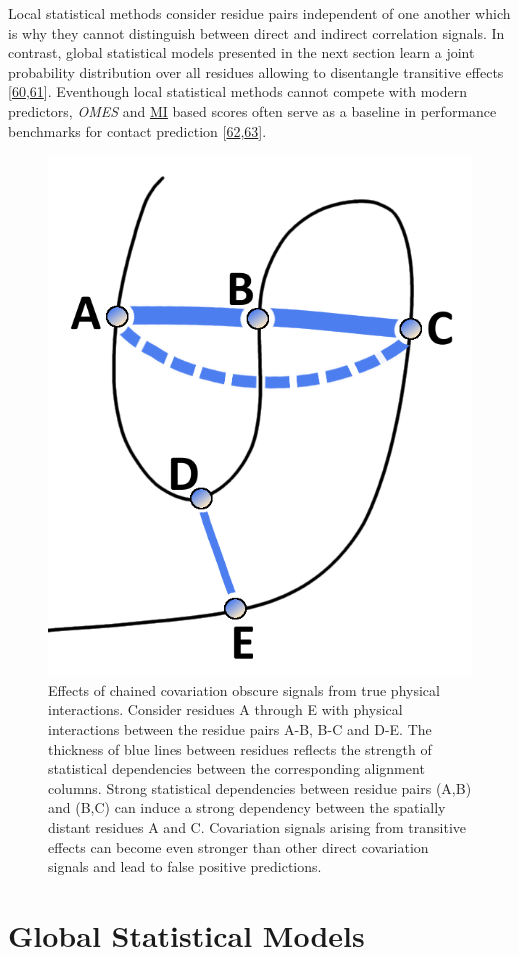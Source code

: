 \documentclass[11pt,a4paper,twoside]{book}
\theoremstyle{definition}
\theoremstyle{definition}
\theoremstyle{remark}
\begin{document}
Local statistical methods consider residue pairs independent of one
another which is why they cannot distinguish between direct and indirect
correlation signals. In contrast, global statistical models presented in
the next section learn a joint probability distribution over all
residues allowing to disentangle transitive effects
{[}\protect\hyperlink{ref-Burger2010}{60},\protect\hyperlink{ref-Weigt2009}{61}{]}.
Eventhough local statistical methods cannot compete with modern
predictors, \emph{OMES} and \protect\hyperlink{abbrev}{MI} based scores
often serve as a baseline in performance benchmarks for contact
prediction
{[}\protect\hyperlink{ref-DeJuan2013}{62},\protect\hyperlink{ref-Jones2012}{63}{]}.












\begin{figure}

{\centering \includegraphics[width=0.25\linewidth]{img/intro/transitive_effects} 

}

\caption{Effects of chained covariation obscure
signals from true physical interactions. Consider residues A through E
with physical interactions between the residue pairs A-B, B-C and D-E.
The thickness of blue lines between residues reflects the strength of
statistical dependencies between the corresponding alignment columns.
Strong statistical dependencies between residue pairs (A,B) and (B,C)
can induce a strong dependency between the spatially distant residues A
and C. Covariation signals arising from transitive effects can become
even stronger than other direct covariation signals and lead to false
positive predictions.}\label{fig:transitive-effect}
\end{figure}

\section{Global Statistical Models}\label{global-methods}
\end{document}
